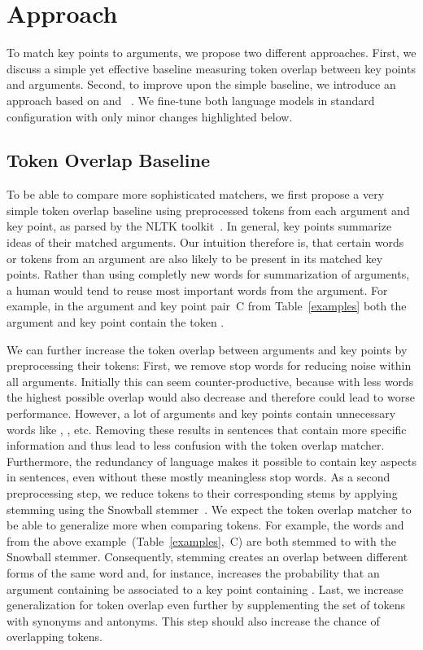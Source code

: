 \section{Approach}\label{approach}

To match key points to arguments, we propose two different approaches.
First, we discuss a simple yet effective baseline measuring token overlap between key points and arguments.
Second, to improve upon the simple baseline, we introduce an approach based on \Bert and \Roberta~\cite{DevlinCLT2019,LiuOGDJCLLZS2019}. We fine-tune both language models in standard configuration with only minor changes highlighted below.

\subsection{Token Overlap Baseline}
To be able to compare more sophisticated matchers, we first propose a very simple token overlap baseline using preprocessed tokens from each argument and key point, as parsed by the NLTK toolkit~\cite{BirdL2004}. 
In general, key points summarize ideas of their matched arguments.
Our intuition therefore is, that certain words or tokens from an argument are also likely to be present in its matched key points.
Rather than using completly new words for summarization of arguments, a human would tend to reuse most important words from the argument.
For example, in the argument and key point pair~C from Table~\ref{examples} both the argument and key point contain the token .

We can further increase the token overlap between arguments and key points by preprocessing their tokens:
First, we remove stop words for reducing noise within all arguments.
Initially this can seem counter-productive, because with less words the highest possible overlap would also decrease and therefore could lead to worse performance.
However, a lot of arguments and key points contain unnecessary words like , ,  etc.
Removing these results in sentences that contain more specific information and thus lead to less confusion with the token overlap matcher.
Furthermore, the redundancy of language makes it possible to contain key aspects in sentences, even without these mostly meaningless stop words.
As a second preprocessing step, we reduce tokens to their corresponding stems by applying stemming using the Snowball stemmer~\cite{Porter1980}. 
We expect the token overlap matcher to be able to generalize more when comparing tokens.
For example, the words  and  from the above example~(Table~\ref{examples},~C) are both stemmed to  with the Snowball stemmer. 
Consequently, stemming creates an overlap between different forms of the same word and, for instance, increases the probability that an argument containing  be associated to a key point containing .
Last, we increase generalization for token overlap even further by supplementing the set of tokens with synonyms and antonyms. This step should also increase the chance of overlapping tokens.

